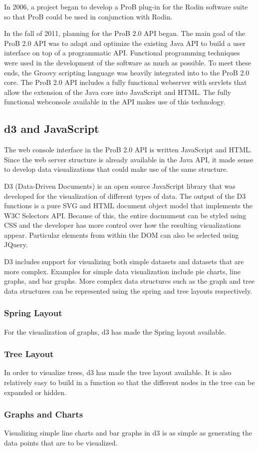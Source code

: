 In 2006, a project began to develop a ProB plug-in for the Rodin software suite so that ProB could be used in conjunction with Rodin. 

In the fall of 2011, planning for the ProB 2.0 API began.  The main goal of the ProB 2.0 API was to adapt and optimize the existing Java API to build a user interface on top of a programmatic API. Functional programming techniques were used in the development of the software as much as possible. To meet these ends, the Groovy scripting language was heavily integrated into to the ProB 2.0 core. The ProB 2.0 API includes a fully functional webserver with servlets that allow the extension of the Java core into JavaScript and HTML. The fully functional webconsole available in the API makes use of this technology.

\subsection{d3 and JavaScript}

The web console interface in the ProB 2.0 API is written JavaScript and HTML. Since the web server structure is already available in the Java API, it made sense to develop data visualizations that could make use of the same structure.

D3 (Data-Driven Documents) is an open source JavaScript library that was developed for the visualization of different types of data. The output of the D3 functions is a pure SVG and HTML document object model that implements the W3C Selectors API. Because of this, the entire docmument can be styled using CSS and the developer has more control over how the resulting visualizations appear. Particular elements from within the DOM can also be selected using JQuery. 

D3 includes support for visualizing both simple datasets and datasets that are more complex. Examples for simple data visualization include pie charts, line graphs, and bar graphs. More complex data structures such as the graph and tree data structures can be represented using the spring and tree layouts respectively.

\subsubsection{Spring Layout}

For the visualization of graphs, d3 has made the Spring layout available.

\subsubsection{Tree Layout}

In order to visualize trees, d3 has made the tree layout available. It is also relatively easy to build in a function so that the different nodes in the tree can be expanded or hidden.

\subsubsection{Graphs and Charts}

Visualizing simple line charts and bar graphs in d3 is as simple as generating the data points that are to be visualized.